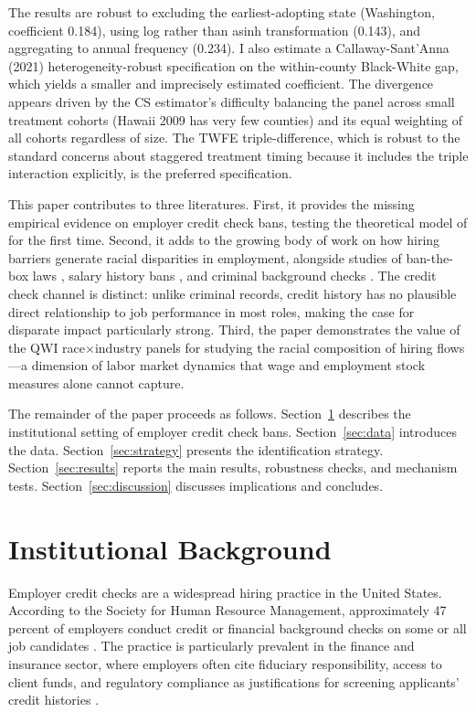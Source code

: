 \documentclass[12pt]{article}
\begin{document}
The results are robust to excluding the earliest-adopting state (Washington, coefficient 0.184), using log rather than asinh transformation (0.143), and aggregating to annual frequency (0.234). I also estimate a Callaway-Sant'Anna (2021) heterogeneity-robust specification on the within-county Black-White gap, which yields a smaller and imprecisely estimated coefficient. The divergence appears driven by the CS estimator's difficulty balancing the panel across small treatment cohorts (Hawaii 2009 has very few counties) and its equal weighting of all cohorts regardless of size. The TWFE triple-difference, which is robust to the standard concerns about staggered treatment timing because it includes the triple interaction explicitly, is the preferred specification.

This paper contributes to three literatures. First, it provides the missing empirical evidence on employer credit check bans, testing the theoretical model of \citet{cortes2021employer} for the first time. Second, it adds to the growing body of work on how hiring barriers generate racial disparities in employment, alongside studies of ban-the-box laws \citep{doleac2020unintended,shoag2020no}, salary history bans \citep{hansen2022unequal}, and criminal background checks \citep{holzer2006perceived}. The credit check channel is distinct: unlike criminal records, credit history has no plausible direct relationship to job performance in most roles, making the case for disparate impact particularly strong. Third, the paper demonstrates the value of the QWI race$\times$industry panels for studying the racial composition of hiring flows---a dimension of labor market dynamics that wage and employment stock measures alone cannot capture.

The remainder of the paper proceeds as follows. Section~\ref{sec:background} describes the institutional setting of employer credit check bans. Section~\ref{sec:data} introduces the data. Section~\ref{sec:strategy} presents the identification strategy. Section~\ref{sec:results} reports the main results, robustness checks, and mechanism tests. Section~\ref{sec:discussion} discusses implications and concludes.

\section{Institutional Background}
\label{sec:background}

Employer credit checks are a widespread hiring practice in the United States. According to the Society for Human Resource Management, approximately 47 percent of employers conduct credit or financial background checks on some or all job candidates \citep{shrm2012background}. The practice is particularly prevalent in the finance and insurance sector, where employers often cite fiduciary responsibility, access to client funds, and regulatory compliance as justifications for screening applicants' credit histories \citep{traub2013discredited}.
\end{document}
